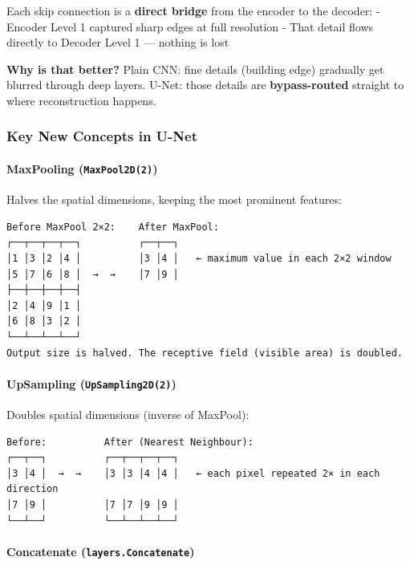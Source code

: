 \documentclass[11pt]{article}
\begin{document}
Each skip connection is a \textbf{direct bridge} from the encoder to the
decoder: - Encoder Level 1 captured sharp edges at full resolution -
That detail flows directly to Decoder Level 1 --- nothing is lost

\textbf{Why is that better?} Plain CNN: fine details (building edge)
gradually get blurred through deep layers. U-Net: those details are
\textbf{bypass-routed} straight to where reconstruction happens.

    \subsubsection{Key New Concepts in
U-Net}\label{key-new-concepts-in-u-net}

\paragraph{\texorpdfstring{MaxPooling
(\texttt{MaxPool2D(2)})}{MaxPooling (MaxPool2D(2))}}\label{maxpooling-maxpool2d2}

Halves the spatial dimensions, keeping the most prominent features:

\begin{verbatim}
Before MaxPool 2×2:    After MaxPool:
┌──┬──┬──┬──┐          ┌──┬──┐
│1 │3 │2 │4 │          │3 │4 │   ← maximum value in each 2×2 window
│5 │7 │6 │8 │  →  →    │7 │9 │
├──┼──┼──┼──┤
│2 │4 │9 │1 │
│6 │8 │3 │2 │
└──┴──┴──┴──┘
Output size is halved. The receptive field (visible area) is doubled.
\end{verbatim}

\paragraph{\texorpdfstring{UpSampling
(\texttt{UpSampling2D(2)})}{UpSampling (UpSampling2D(2))}}\label{upsampling-upsampling2d2}

Doubles spatial dimensions (inverse of MaxPool):

\begin{verbatim}
Before:          After (Nearest Neighbour):
┌──┬──┐          ┌──┬──┬──┬──┐
│3 │4 │  →  →    │3 │3 │4 │4 │   ← each pixel repeated 2× in each direction
│7 │9 │          │7 │7 │9 │9 │
└──┴──┘          └──┴──┴──┴──┘
\end{verbatim}

\paragraph{\texorpdfstring{Concatenate
(\texttt{layers.Concatenate})}{Concatenate (layers.Concatenate)}}\label{concatenate-layers.concatenate}
\end{document}
